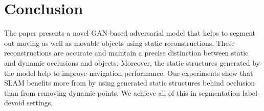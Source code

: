 \documentclass[10pt,twocolumn,letterpaper]{article}
\begin{document}
\section{Conclusion}

The paper presents a novel GAN-based adversarial model that helps to segment out moving as well as movable objects using static reconstructions. These reconstructions are accurate and maintain a precise distinction between static and dynamic occlusions and objects.  Moreover, the static structures generated by the model help to improve navigation performance. Our experiments show that SLAM benefits more from by using generated static structures behind occlusion than from removing dynamic points. We achieve all of this in segmentation label-devoid settings.


{\small



}
\end{document}
